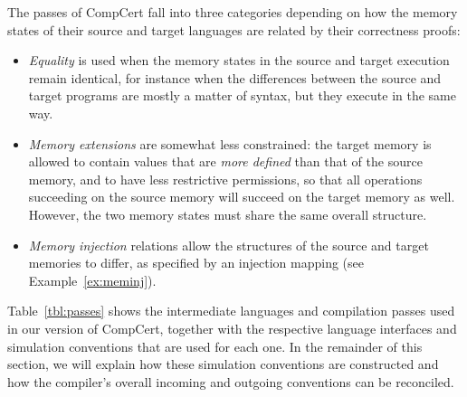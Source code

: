 \documentclass[acmsmall,timestamp,review,anonymous]{acmart}
\begin{document}
The passes of CompCert fall into three categories
depending on how
the memory states of their source and target languages are related
by their correctness proofs:
\begin{itemize}
\item \emph{Equality} is used when the memory states
  in the source and target execution remain identical,
  for instance when the differences between
  the source and target programs are mostly a matter of syntax,
  but they execute in the same way.
\item \emph{Memory extensions} are somewhat less constrained:
  the target memory is allowed to contain values that are
  \emph{more defined} than that of the source memory,
  and to have less restrictive permissions,
  so that all operations succeeding on the source memory
  will succeed on the target memory as well.
  However,
  the two memory states must share the same overall structure.
\item \emph{Memory injection} relations
  allow the structures of the source and target memories
  to differ, as specified by an injection mapping
  (see Example~\ref{ex:meminj}).
\end{itemize}

Table~\ref{tbl:passes} shows
the intermediate languages and compilation passes
used in our version of CompCert,
together with the respective
language interfaces and
simulation conventions
that are used for each one.
In the remainder of this section,
we will explain how these simulation conventions are constructed
and how the compiler's overall incoming and outgoing conventions
can be reconciled.
\end{document}
